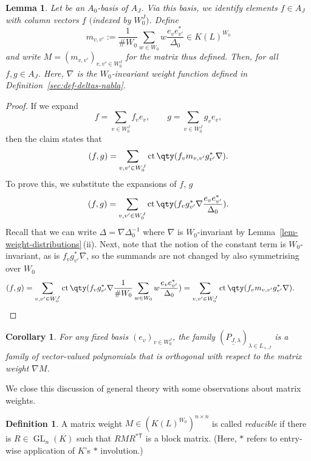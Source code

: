 \documentclass[pdftex]{sigma}
\newtheorem{Lemma}[Theorem]{Lemma}
\newtheorem{Corollary}[Theorem]{Corollary}
\theoremstyle{definition}
\newtheorem{Definition}[Theorem]{Definition}
\numberwithin{equation}{section}
\begin{document}
\begin{Lemma}\label{sec:lem-matrix-weight}
 Let  be an $A_0$-basis of $A_J$. Via this basis, we identify
 elements $f\in A_J$ with column vectors $\underline{f}$ $\big($indexed by $W_0^J\big)$. Define
 \[
 m_{v,v'} := \frac{1}{\#W_0} \sum_{w\in W_0} w\frac{e_v e_{v'}^*}{\Delta_0} \in K(L)^{W_0}
 \]
 and write $M=(m_{v,v'})_{v,v'\in W_0^J}$ for the matrix thus defined. Then,
 for all $f,g\in A_J$. Here, $\nabla$ is the $W_0$-invariant weight
 function defined in Definition~{\rm \ref{sec:def-deltas-nabla}}.
\end{Lemma}
\begin{proof}
 If we expand
 \[
 f = \sum_{v\in W_0^J} f_v e_v, \qquad g = \sum_{v\in W_0^J} g_v e_v,
 \]
 then the claim states that
 \[
 (f,g) = \sum_{v,v'\in W_0^J} \operatorname{ct}\qty(f_v m_{v,v'} g_{v'}^*\nabla).
 \]
 To prove this, we substitute the expansions of $f$, $g$
 \[
 (f,g) = \sum_{v,v'\in W_0^J} \operatorname{ct}\qty(f_v g_{v'}^*
 \nabla \frac{e_v e_{v'}^*}{\Delta_0}).
 \]
 Recall that we can write $\Delta=\nabla\Delta_0^{-1}$ where $\nabla$ is
 $W_0$-invariant by Lemma~\ref{lem-weight-distributions}\,(ii).
 Next, note that the notion of the constant term is $W_0$-invariant, as is
 $f_v g_{v'}^*\nabla$, so the summands are not changed by also symmetrising over
 $W_0$
 \[
 (f,g) = \sum_{v,v'\in W_0^J} \operatorname{ct}\qty(
 f_v g_{v'}^*\nabla \frac{1}{\#W_0} \sum_{w\in W_0} w \frac{e_v e_{v'}^*}{\Delta_0})
 = \sum_{v,v'\in W_0^J} \operatorname{ct}\qty(f_v m_{v,v'} g_{v'}^* \nabla).\tag*{\qed}
 \] \renewcommand{\qed}{}
\end{proof}

\begin{Corollary}
 For any fixed basis $(e_v)_{v\in W_0^J}$, the family
 $(\underline{P_{J,\lambda}})_{\lambda\in L_{+,J}}$ is a family of vector-valued polynomials
 that is orthogonal with respect to the matrix weight $\nabla M$.
\end{Corollary}

We close this discussion of general theory with some observations about
matrix weights.

\begin{Definition}
 A matrix weight $M\in (K(L)^{W_0})^{n\times n}$ is called \emph{reducible} if there is
 $R\in\operatorname{GL}_n(K)$ such that $R M R^{*{\mathsf T}}$ is a block matrix.
(Here, $*$ refers to entry-wise application of $K$'s $*$ involu\-tion.)
\end{Definition}
\end{document}

